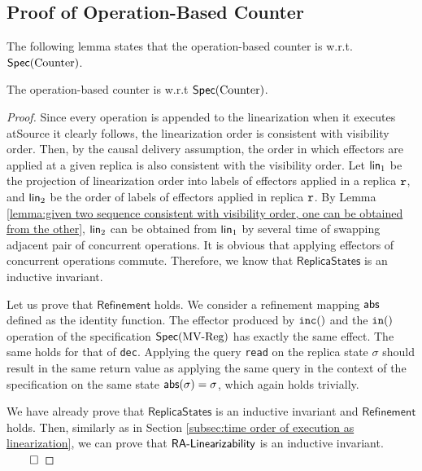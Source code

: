 \subsection{Proof of Operation-Based Counter}
\label{subsec:proof of operation-based counter}

The following lemma states that the operation-based counter is \crdtlinearizable{} w.r.t. $\specCounter$.

\begin{lemma}
\label{lemma:operation-based counter is correct}
The operation-based counter is \crdtlinearizable{} w.r.t $\specCounter$.
\end{lemma}

\begin {proof}
Since every operation is appended to the linearization when it executes atSource it clearly follows, the linearization order is consistent with visibility order. Then, by the causal delivery assumption, the order in which effectors are applied at a given replica is also consistent with the visibility order. Let $\alinord_1$ be the projection of linearization order into labels of effectors applied in a replica $\arep$, and $\alinord_2$ be the order of labels of effectors applied in replica $\arep$. By Lemma \ref{lemma:given two sequence consistent with visibility order, one can be obtained from the other}, $\alinord_2$ can be obtained from $\alinord_1$ by several time of swapping adjacent pair of concurrent operations. It is obvious that applying effectors of concurrent operations commute. Therefore, we know that $\mathsf{ReplicaStates}$ is an inductive invariant.

Let us prove that $\mathsf{Refinement}$ holds. We consider a refinement mapping $\refmap$ defined as the identity function. The effector produced by $\alabelshort[{\tt inc}]{}$ and the $\alabelshort[{\tt in}]{}$ operation of the specification $\specMVReg$ has exactly the same effect. The same holds for that of {\tt dec}. Applying the query {\tt read} on the replica state $\sigma$ should result in the same return value as applying the same query in the context of the specification on the same state $\refmap(\sigma)=\sigma$, which again holds trivially.

We have already prove that $\mathsf{ReplicaStates}$ is an inductive invariant and $\mathsf{Refinement}$ holds. Then, similarly as in Section \ref{subsec:time order of execution as linearization}, we can prove that $\mathsf{\CRDTLinshort{}}$ is an inductive invariant. $\qed$
\end {proof}








